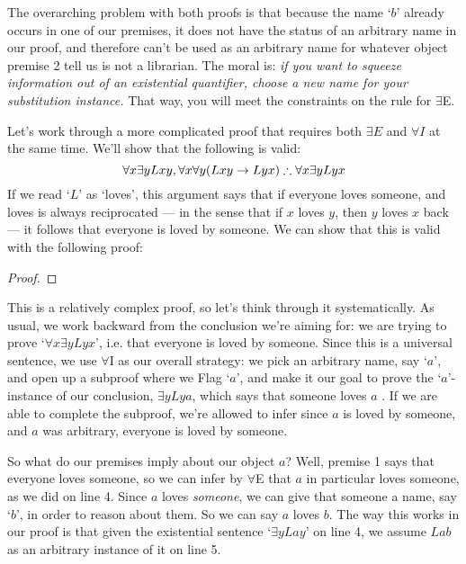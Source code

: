 The overarching problem with both proofs is that because the name `$b$' already occurs in one of our premises, it does not have the status of an arbitrary name in our proof, and therefore can't be used as an arbitrary name for whatever object premise 2 tell us is not a librarian.  The moral is: \emph{if you want to squeeze information out of an existential quantifier, choose a new name for your substitution instance.} That way, you will meet the constraints on the rule for $\exists$E.

Let's work through a more complicated proof that requires both $\exists E$ and $\forall I$ at the same time. We'll show that the following is valid:
$$\forall x\exists yLxy, \forall x \forall y(Lxy \rightarrow Lyx) \therefore \forall x\exists yLyx$$
If we read `$L$' as `loves', this argument says that if everyone loves someone, and loves is always reciprocated --- in the sense that if $x$ loves $y$, then $y$ loves $x$ back --- it follows that everyone is loved by someone.  We can show that this is valid with the following proof:

\begin{proof}
\open
	 
	 
	\open
		  
		 
		 
		 
		 
	\close
	 
\close
{} 
\end{proof}
This is a relatively complex proof, so let's think through it systematically.  As usual, we work backward from the conclusion we're aiming for: we are trying to prove `$\forall x\exists yLyx$', i.e. that everyone is loved by someone.  Since this is a universal sentence, we use $\forall$I as our overall strategy: we pick an arbitrary name, say `$a$', and open up a subproof where we Flag `$a$', and make it our goal to prove the `$a$'-instance of our conclusion, $\exists yLya$, which says that someone loves $a$ .  If we are able to complete the subproof, we're allowed to infer since $a$ is loved by someone, and $a$ was arbitrary, everyone is loved by someone. 

So what do our premises imply about our object $a$?  Well, premise 1 says that everyone loves someone, so we can infer by $\forall$E that $a$ in particular loves someone, as we did on line 4.  Since $a$ loves \emph{someone}, we can give that someone a name, say `$b$', in order to reason about them.  So we can say $a$ loves $b$.  The way this works in our proof is that given the existential sentence `$\exists yLay$' on line 4, we assume $Lab$ as an arbitrary instance of it on line 5.

